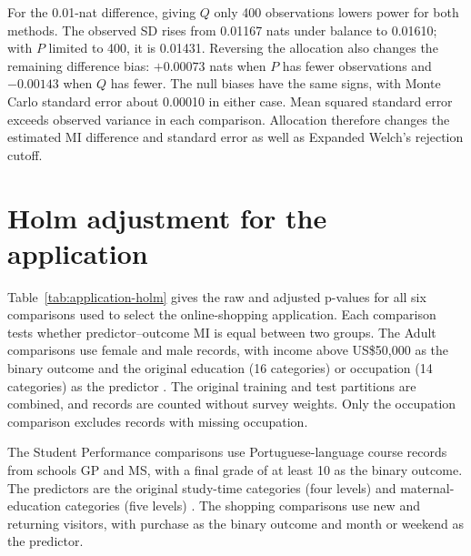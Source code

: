 For the 0.01-nat difference, giving \(Q\) only 400 observations lowers
power for both methods. The observed SD rises from 0.01167 nats
under balance to 0.01610; with \(P\) limited to 400, it is 0.01431.
Reversing the allocation also changes the remaining difference bias:
\(+0.00073\) nats when \(P\) has fewer observations and
\(-0.00143\) when \(Q\) has fewer. The null biases have the same
signs, with Monte Carlo standard error about 0.00010 in either case.
Mean squared standard error exceeds observed variance in each comparison.
Allocation therefore changes the estimated MI difference and standard error
as well as Expanded Welch's rejection cutoff.

\section{Holm adjustment for the application}
\label{sec:application-holm}

Table~\ref{tab:application-holm} gives the raw and adjusted p-values for
all six comparisons used to select the online-shopping application.
Each comparison tests whether predictor--outcome MI is equal between
two groups. The Adult comparisons use female and male records, with
income above US\$50,000 as the binary outcome and the original education
(16 categories) or occupation (14 categories) as the predictor
\citep{becker1996}. The original training and test partitions are combined,
and records are counted without survey weights. Only the occupation
comparison excludes records with missing occupation.

The Student Performance comparisons
use Portuguese-language course records from schools GP and MS, with a final grade
of at least 10 as the binary outcome. The predictors are the original
study-time categories (four levels) and maternal-education categories
(five levels) \citep{cortez2008}. The shopping comparisons use new and
returning visitors, with purchase as the binary outcome and month or
weekend as the predictor.

